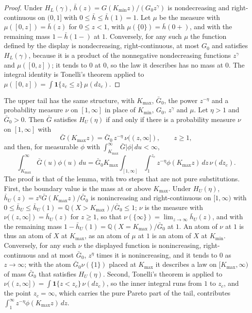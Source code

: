 \documentclass[11pt]{article}
\theoremstyle{remark}
\newcommand{\Q}{\mathbb{Q}}
\begin{document}
\begin{proof}
Under $H_L(\gamma)$, $\bar h(z)=G(K_{\min}z)/(G_0z^\gamma)$ is nondecreasing and right-continuous on $(0,1]$ with $0\le\bar h\le\bar h(1)=1$. Let $\mu$ be the measure with $\mu([0,z])=\bar h(z)$ for $0\le z<1$, with $\mu(\{0\})=\bar h(0+)$, and with the remaining mass $1-\bar h(1-)$ at $1$. Conversely, for any such $\mu$ the function defined by the display is nondecreasing, right-continuous, at most $G_0$ and satisfies $H_L(\gamma)$, because it is a product of the nonnegative nondecreasing functions $z^\gamma$ and $\mu([0,z])$; it tends to $0$ at $0$, so the law it describes has no mass at $0$. The integral identity is Tonelli's theorem applied to $\mu([0,z])=\int\mathbf 1\{z_c\le z\}\,\mu(dz_c)$.
\end{proof}

The upper tail has the same structure, with $K_{\max}$, $\bar G_0$, the power $z^{-\eta}$ and a probability measure $\nu$ on $[1,\infty]$ in place of $K_{\min}$, $G_0$, $z^\gamma$ and $\mu$. Let $\eta>1$ and $\bar G_0>0$. Then $\bar G$ satisfies $H_U(\eta)$ if and only if there is a probability measure $\nu$ on $[1,\infty]$ with
\[
\bar G(K_{\max}z)=\bar G_0\,z^{-\eta}\,\nu((z,\infty]),\qquad z\ge1,
\]
and then, for measurable $\phi$ with $\int_{K_{\max}}^\infty\bar G|\phi|\,du<\infty$,
\[
\int_{K_{\max}}^\infty\bar G(u)\phi(u)\,du=\bar G_0K_{\max}\int_{[1,\infty]}\int_1^{z_c}z^{-\eta}\phi(K_{\max}z)\,dz\,\nu(dz_c).
\]
The proof is that of the lemma, with two steps that are not pure substitutions. First, the boundary value is the mass at or above $K_{\max}$. Under $H_U(\eta)$, $\bar h_U(z)=z^\eta\bar G(K_{\max}z)/\bar G_0$ is nonincreasing and right-continuous on $[1,\infty)$ with $0\le\bar h_U\le\bar h_U(1)=\Q(X>K_{\max})/\bar G_0\le1$; $\nu$ is the measure with $\nu((z,\infty])=\bar h_U(z)$ for $z\ge1$, so that $\nu(\{\infty\})=\lim_{z\to\infty}\bar h_U(z)$, and with the remaining mass $1-\bar h_U(1)=\Q(X=K_{\max})/\bar G_0$ at $1$. An atom of $\nu$ at $1$ is thus an atom of $X$ at $K_{\max}$, as an atom of $\mu$ at $1$ is an atom of $X$ at $K_{\min}$. Conversely, for any such $\nu$ the displayed function is nonincreasing, right-continuous and at most $\bar G_0$, $z^\eta$ times it is nonincreasing, and it tends to $0$ as $z\to\infty$; with the atom $\bar G_0\nu(\{1\})$ placed at $K_{\max}$ it describes a law on $[K_{\max},\infty)$ of mass $\bar G_0$ that satisfies $H_U(\eta)$. Second, Tonelli's theorem is applied to $\nu((z,\infty])=\int\mathbf 1\{z<z_c\}\,\nu(dz_c)$, so the inner integral runs from $1$ to $z_c$, and the point $z_c=\infty$, which carries the pure Pareto part of the tail, contributes $\int_1^\infty z^{-\eta}\phi(K_{\max}z)\,dz$.
\end{document}
